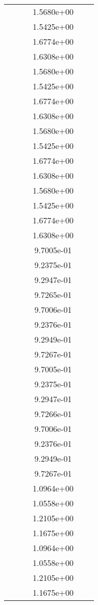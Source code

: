 \begin{xltabular}{\textwidth}{r|rS[table-format=1.3e+2]S[table-format=1.4e+2]S[table-format=1.4e+2]S[table-format=-1.5]}
&  &  & 1.5680e+00 & & \\
&  &  & 1.5425e+00 & & \\
&  &  & 1.6774e+00 & & \\
&  &  & 1.6308e+00 & & \\
&  &  & 1.5680e+00 & & \\
&  &  & 1.5425e+00 & & \\
&  &  & 1.6774e+00 & & \\
&  &  & 1.6308e+00 & & \\
&  &  & 1.5680e+00 & & \\
&  &  & 1.5425e+00 & & \\
&  &  & 1.6774e+00 & & \\
&  &  & 1.6308e+00 & & \\
&  &  & 1.5680e+00 & & \\
&  &  & 1.5425e+00 & & \\
&  &  & 1.6774e+00 & & \\
&  &  & 1.6308e+00 & & \\
&  &  & 9.7005e-01 & & \\
&  &  & 9.2375e-01 & & \\
&  &  & 9.2947e-01 & & \\
&  &  & 9.7265e-01 & & \\
&  &  & 9.7006e-01 & & \\
&  &  & 9.2376e-01 & & \\
&  &  & 9.2949e-01 & & \\
&  &  & 9.7267e-01 & & \\
&  &  & 9.7005e-01 & & \\
&  &  & 9.2375e-01 & & \\
&  &  & 9.2947e-01 & & \\
&  &  & 9.7266e-01 & & \\
&  &  & 9.7006e-01 & & \\
&  &  & 9.2376e-01 & & \\
&  &  & 9.2949e-01 & & \\
&  &  & 9.7267e-01 & & \\
&  &  & 1.0964e+00 & & \\
&  &  & 1.0558e+00 & & \\
&  &  & 1.2105e+00 & & \\
&  &  & 1.1675e+00 & & \\
&  &  & 1.0964e+00 & & \\
&  &  & 1.0558e+00 & & \\
&  &  & 1.2105e+00 & & \\
&  &  & 1.1675e+00 & & \\

\end{xltabular}
